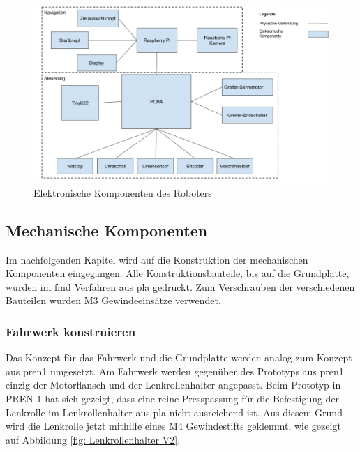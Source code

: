 \begin{figure}[H]
\centering
\includegraphics[width=\textwidth]{assets/gesamtkonzept/electronics.png}
\caption{Elektronische Komponenten des Roboters}
\label{fig:electro-components}
\end{figure} 

\newpage

\subsection{Mechanische Komponenten}
\label{Mechanische Komponenten}

Im nachfolgenden Kapitel wird auf die Konstruktion der mechanischen Komponenten eingegangen. Alle Konstruktionsbauteile, bis auf die Grundplatte, wurden im \acrfull{fmd} Verfahren aus \acrfull{pla} gedruckt. Zum Verschrauben der verschiedenen Bauteilen wurden M3 Gewindeeinsätze verwendet.

\subsubsection{Fahrwerk konstruieren}
\label{Fahrwerk konstruieren}

 Das Konzept für das Fahrwerk und die Grundplatte werden analog zum Konzept aus \acrshort{pren1} umgesetzt. Am Fahrwerk werden gegenüber des Prototyps aus \acrshort{pren1} einzig der Motorflansch und der Lenkrollenhalter angepasst. 
 Beim Prototyp in PREN 1 hat sich gezeigt, dass eine reine Presspassung für die Befestigung der Lenkrolle im Lenkrollenhalter aus \acrshort{pla} nicht ausreichend ist. Aus diesem Grund wird die Lenkrolle jetzt mithilfe eines M4 Gewindestifts geklemmt, wie gezeigt auf Abbildung \ref{fig: Lenkrollenhalter V2}.

